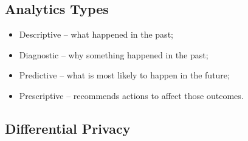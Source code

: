\subsection{Analytics Types}

\begin{itemize}
    \item Descriptive – what happened in the past;
    \item Diagnostic – why something happened in the past;
    \item Predictive – what is most likely to happen in the future;
    \item Prescriptive – recommends actions to affect those outcomes.
\end{itemize}

\subsection{Differential Privacy}


